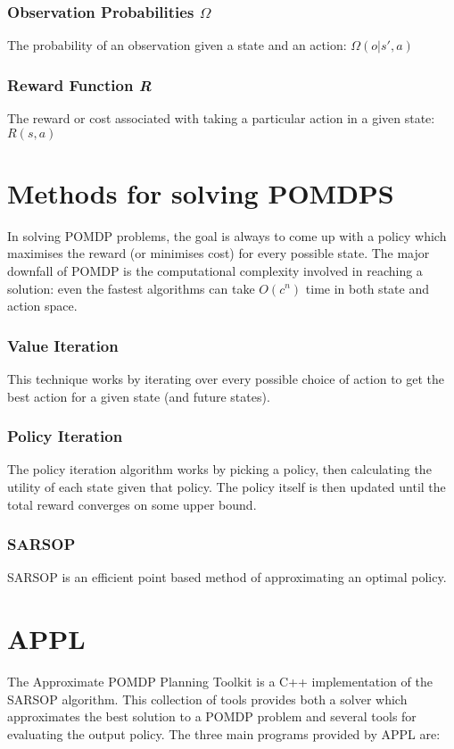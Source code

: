 \documentclass[12pt,openany,a4paper]{book}
\begin{document}
\subsubsection*{Observation Probabilities \emph{\ensuremath{\Omega}}}
The probability of an observation given a state and an action: \ensuremath{\Omega(o | s',a)}

\subsubsection*{Reward Function \emph{R}}
The reward or cost associated with taking a particular action in a given state: \ensuremath{R(s,a)}

\section{Methods for solving POMDPS} %
In solving POMDP problems, the goal is always to come up with a policy which maximises the reward (or minimises cost) for every possible state. The major downfall of POMDP is the computational complexity involved in reaching a solution: even the fastest algorithms can take \ensuremath{O(c^{n})} time in both state and action space.
\subsubsection{Value Iteration}
This technique works by iterating over every possible choice of action to get the best action for a given state (and future states).

\subsubsection{Policy Iteration}
The policy iteration algorithm works by picking a policy, then calculating
the utility of each state given that policy\cite{Norvig}. The policy itself is then updated until the total reward converges on some upper bound.

\subsubsection{SARSOP}
SARSOP is an efficient point based method of approximating an optimal policy. \cite{sarsop}

\section{APPL}
The Approximate POMDP Planning Toolkit is a C++ implementation of the SARSOP algorithm.  This collection of tools provides both a solver which approximates the best solution to a POMDP problem and several tools for evaluating the output policy. The three main programs provided by APPL are:
\end{document}
